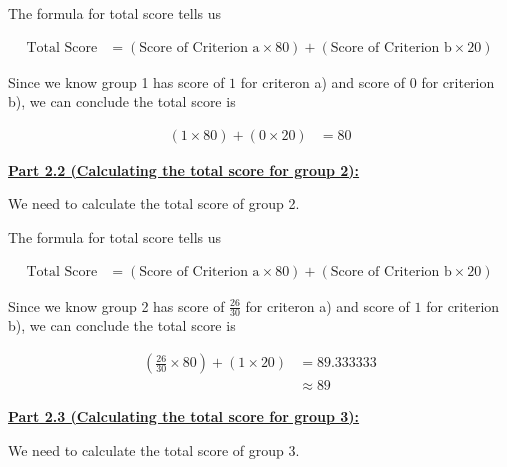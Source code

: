 \documentclass[12pt]{article}
\begin{document}
\begin{mdframed}
\begin{itemize}
\begin{mdframed}
            \bigskip

            The formula for total score tells us

            \begin{align}
                \text{Total Score} &= (\text{Score of Criterion a} \times 80) + (\text{Score of Criterion b} \times 20)
            \end{align}

            \bigskip

            Since we know group 1 has score of $1$ for criteron a) and score of $0$ for
            criterion b), we can conclude the total score is

            \begin{align}
                (1 \times 80) + (0 \times 20) &= 80
            \end{align}

            \bigskip

            \underline{\textbf{Part 2.2 (Calculating the total score for group 2):}}

            \bigskip

            We need to calculate the total score of group 2.

            \bigskip

            The formula for total score tells us

            \begin{align}
                \text{Total Score} &= (\text{Score of Criterion a} \times 80) + (\text{Score of Criterion b} \times 20)
            \end{align}

            \bigskip

            Since we know group 2 has score of $\frac{26}{30}$ for criteron a) and score of $1$ for
            criterion b), we can conclude the total score is

            \begin{align}
                (\frac{26}{30} \times 80) + (1 \times 20) &= 89.333333\\
                &\approx 89
            \end{align}

            \bigskip

            \underline{\textbf{Part 2.3 (Calculating the total score for group 3):}}

            \bigskip

            We need to calculate the total score of group 3.


\end{mdframed}
\end{itemize}
\end{mdframed}
\end{document}
